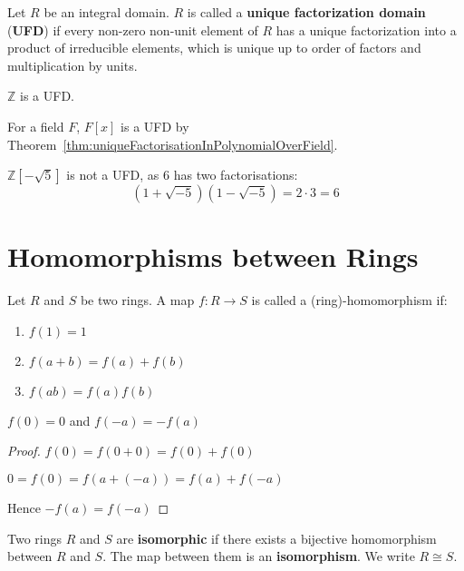 \begin{definition}
	Let $R$ be an integral domain. $R$ is called a \textbf{unique factorization domain} (\textbf{UFD}) if every non-zero non-unit element of $R$ has a unique factorization into a product of irreducible elements, which is unique up to order of factors and multiplication by units.
\end{definition}

\begin{example}
	$\mathbb{Z}$ is a UFD.
\end{example}

\begin{example}
	For a field $F$, $F[x]$ is a UFD by Theorem~\ref{thm:uniqueFactorisationInPolynomialOverField}.
\end{example}

\begin{example}
	$\mathbb{Z}[-\sqrt{5}]$ is not a UFD, as $6$ has two factorisations:
	\[
		(1 + \sqrt{-5}) (1 - \sqrt{-5}) = 2 \cdot 3 = 6
	\]
\end{example}

\section{Homomorphisms between Rings}	

Let $R$ and $S$ be two rings. A map $f: R \rightarrow S$ is called a (ring)-homomorphism if:
\begin{enumerate}
	\item $f(1) = 1$
	\item $f(a + b) = f(a) + f(b)$
	\item $f(ab) = f(a)f(b)$
\end{enumerate}

\begin{lemma}
	$f(0) = 0$ and $f(-a) = -f(a)$
\end{lemma}

\begin{proof}
	$f(0) = f(0 + 0) = f(0) + f(0)$

	$0 = f(0) = f(a + (-a)) = f(a) + f(-a)$

	Hence $-f(a) = f(-a)$
\end{proof}

\begin{definition}
	Two rings $R$ and $S$ are \textbf{isomorphic} if there exists a bijective homomorphism between $R$ and $S$. The map between them is an \textbf{isomorphism}. We write $R \cong S$.
\end{definition}

